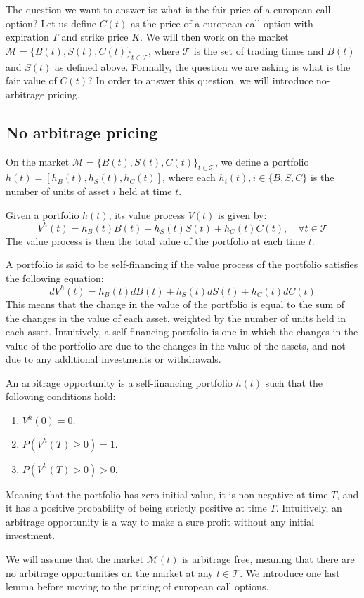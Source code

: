 The question we want to answer is: what is the fair price of a european call option? Let us define $C(t)$ as the price of a european call option with expiration $T$ and strike price $K$. We will then work on the market $\mathcal{M} = \{B(t),S(t),C(t)\}_{t\in\mathcal{T}}$, where $\mathcal{T}$ is the set of trading times and $B(t)$ and $S(t)$ as defined above. Formally, the question we are asking is what is the fair value of $C(t)$? In order to answer this question, we will introduce no-arbitrage pricing.

\subsection{No arbitrage pricing}
On the market $\mathcal{M} = \{B(t),S(t),C(t)\}_{t\in\mathcal{T}}$, we define a portfolio $h(t) = [h_B(t),h_S(t),h_C(t)]$, where each $h_i(t), i\in \{B,S,C\}$ is the number of units of asset $i$ held at time $t$. 
\begin{definition}
    Given a portfolio $h(t)$, its value process $V(t)$ is given by:
    \begin{equation}
        V^h(t) = h_B(t)B(t) + h_S(t)S(t) + h_C(t)C(t), \quad \forall t\in\mathcal{T}
    \end{equation}
    The value process is then the total value of the portfolio at each time $t$.
\end{definition}

\begin{definition}
    A portfolio is said to be self-financing if the value process of the portfolio satisfies the following equation:
    \begin{equation}
        dV^h(t) = h_B(t)dB(t) + h_S(t)dS(t) + h_C(t)dC(t)
    \end{equation}
    This means that the change in the value of the portfolio is equal to the sum of the changes in the value of each asset, weighted by the number of units held in each asset. Intuitively, a self-financing portfolio is one in which the changes in the value of the portfolio are due to the changes in the value of the assets, and not due to any additional investments or withdrawals.
\end{definition}
\begin{definition}
    An arbitrage opportunity is a self-financing portfolio $h(t)$ such that the following conditions hold:
    \begin{enumerate}
        \item $V^h(0) = 0$.
        \item $P(V^h(T) \geq 0) = 1$.
        \item $P(V^h(T) > 0) > 0$.
    \end{enumerate}
    Meaning that the portfolio has zero initial value, it is non-negative at time $T$, and it has a positive probability of being strictly positive at time $T$. Intuitively, an arbitrage opportunity is a way to make a sure profit without any initial investment.
\end{definition}
We will assume that the market $\mathcal{M}(t)$ is arbitrage free, meaning that there are no arbitrage opportunities on the market at any $t\in\mathcal{T}$. We introduce one last lemma before moving to the pricing of european call options.

